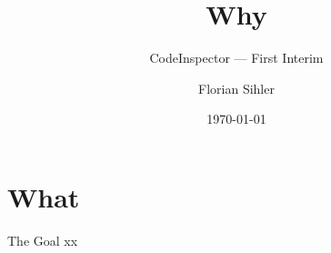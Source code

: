 \documentclass[aspectratio=169,usepdftitle=true,handout]{beamer}
\title{Why}
\subtitle{CodeInspector --- First Interim}
\date{\today}
\author[F.~Sihler]{Florian Sihler}
\begin{document}
\section{What}
\begin{frame}[fragile]{The Goal}
xx
\end{frame}
\end{document}
